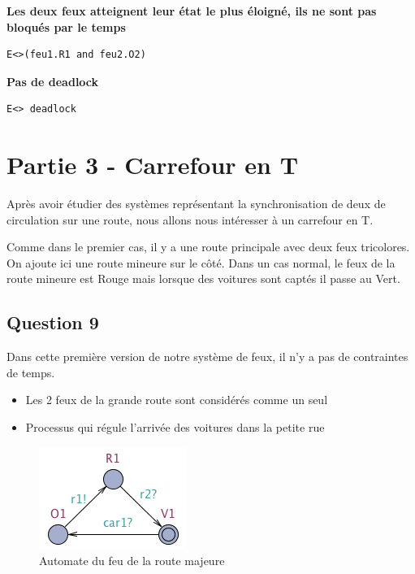 \documentclass[11pt]{article}
\begin{document}
\textbf{Les deux feux atteignent leur état le plus éloigné, ils ne sont pas bloqués par le temps}
\begin{verbatim}
E<>(feu1.R1 and feu2.O2)
\end{verbatim}

\textbf{Pas de deadlock}
\begin{verbatim}
E<> deadlock
\end{verbatim}

\section{Partie 3 - Carrefour en T}
Après avoir étudier des systèmes représentant la synchronisation de deux de circulation sur une route, nous allons nous intéresser à un carrefour en T.

Comme dans le premier cas, il y a une route principale avec deux feux tricolores. On ajoute ici une route mineure sur le côté. Dans un cas normal, le feux de la route mineure est Rouge mais lorsque des voitures sont captés il passe au Vert.

\subsection{Question 9}

Dans cette première version de notre système de feux, il n'y a pas de contraintes de temps.


\begin{itemize}
	\item Les 2 feux de la grande route sont considérés comme un seul
	\item Processus qui régule l'arrivée des voitures dans la petite rue
\end{itemize}

\begin{figure}[H]
	\centering
	\includegraphics{ressources/part3/Q9-1.png}
	\caption{Automate du feu de la route majeure}
\end{figure}
\end{document}
